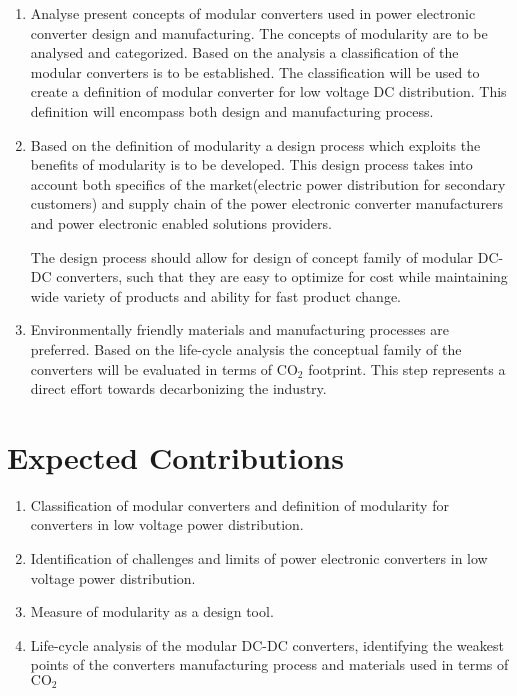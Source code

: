 \documentclass[]{scrreprt}
\begin{document}
\begin{enumerate}
	\item Analyse present concepts of modular converters used in power electronic converter design and manufacturing. The concepts of modularity are to be analysed and categorized. Based on the analysis a classification of the modular converters is to be established. The classification will be used to create a definition of modular converter for low voltage DC distribution. This definition will encompass both design and manufacturing process. %
	\item  Based on the definition of modularity a design process which exploits the benefits of modularity is to be developed. This design process takes into account both specifics of the market(electric power distribution for secondary customers) and supply chain of the power electronic converter manufacturers and power electronic enabled solutions providers. 
	
	The design process should allow for design of concept family of modular DC-DC converters, such that they are easy to optimize for cost while maintaining wide variety of products and ability for fast product change.
	\item Environmentally friendly materials and manufacturing processes are preferred. Based on the life-cycle analysis the conceptual family of the converters will be evaluated in terms of $\text{CO}_2$ footprint. This step represents a direct effort towards decarbonizing the industry. 
\end{enumerate}

\section{Expected Contributions}

\begin{enumerate}
	\item Classification of modular converters and definition of modularity for converters in low voltage power distribution.
	\item Identification of challenges and limits of power electronic converters in low voltage power distribution.
	\item Measure of modularity as a design tool.
	\item Life-cycle analysis of the modular DC-DC converters, identifying the weakest points of the converters manufacturing process and materials used in terms of $\text{CO}_2$
\end{enumerate}
\newpage
\end{document}

